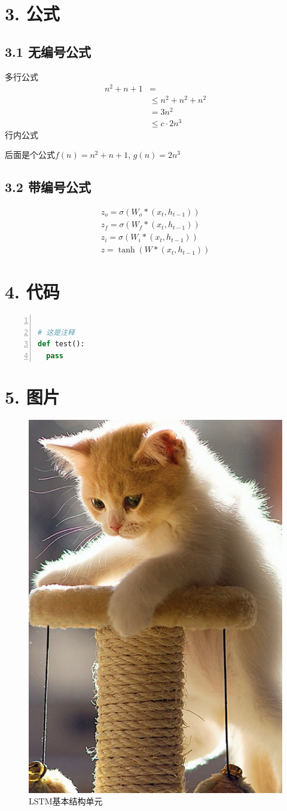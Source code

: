 \documentclass{article}
\begin{document}
\section{3. 公式}
\subsection{3.1 无编号公式}

多行公式
\[
\begin{split}
n^2 + n + 1 &=
\\
&\leq n^2 + n^2 + n^2
\\
&= 3n^2
\\
&\leq c \cdot 2n^3
\end{split}
\]
行内公式

后面是个公式\(f(n) = n^2 + n + 1\), \(g(n) = 2n^3\)

\subsection{3.2 带编号公式}
\begin{equation}
\begin{split}
z_o = \sigma(W_o*(x_t,h_{t-1}))\\
z_f = \sigma(W_f*(x_t,h_{t-1}))\\
z_i = \sigma(W_i*(x_t,h_{t-1}))\\
z = \tanh(W*(x_t,h_{t-1}))
\end{split}
\end{equation}

\section{4. 代码}
\begin{lstlisting}[language = python, numbers=left, 
numberstyle=\tiny,keywordstyle=\color{blue!70},
commentstyle=\color{red!50!green!50!blue!50},frame=shadowbox,
rulesepcolor=\color{red!20!green!20!blue!20},basicstyle=\ttfamily]

# 这是注释
def test():
  pass

\end{lstlisting}

\section{5. 图片} 
\begin{figure}[H]
	\centering
	\includegraphics[width=0.3\linewidth]{images/test-fig.png}
	\caption{LSTM基本结构单元}
	\label{fig:LSTM基本结构单元}
\end{figure}
\end{document}
